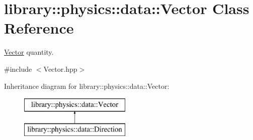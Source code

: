 \hypertarget{classlibrary_1_1physics_1_1data_1_1_vector}{}\section{library\+:\+:physics\+:\+:data\+:\+:Vector Class Reference}
\label{classlibrary_1_1physics_1_1data_1_1_vector}


\hyperlink{classlibrary_1_1physics_1_1data_1_1_vector}{Vector} quantity.  




{\ttfamily \#include $<$Vector.\+hpp$>$}

Inheritance diagram for library\+:\+:physics\+:\+:data\+:\+:Vector\+:\begin{figure}[H]
\begin{center}
\leavevmode
\includegraphics[height=2.000000cm]{classlibrary_1_1physics_1_1data_1_1_vector}
\end{center}
\end{figure}
